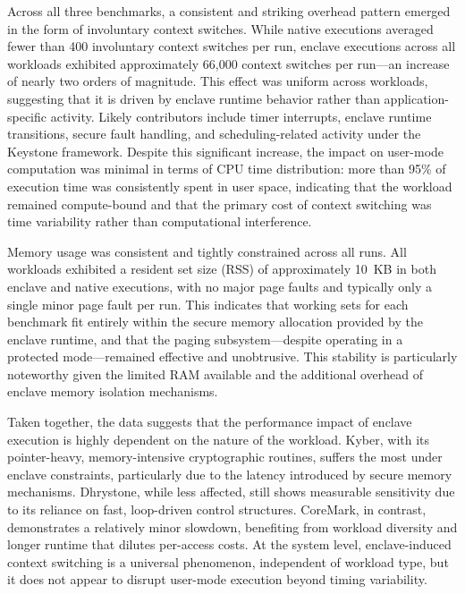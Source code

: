 Across all three benchmarks, a consistent and striking overhead pattern emerged in the form of involuntary context switches. While native executions averaged fewer than 400 involuntary context switches per run, enclave executions across all workloads exhibited approximately 66,000 context switches per run—an increase of nearly two orders of magnitude. This effect was uniform across workloads, suggesting that it is driven by enclave runtime behavior rather than application-specific activity. Likely contributors include timer interrupts, enclave runtime transitions, secure fault handling, and scheduling-related activity under the Keystone framework. Despite this significant increase, the impact on user-mode computation was minimal in terms of CPU time distribution: more than 95\% of execution time was consistently spent in user space, indicating that the workload remained compute-bound and that the primary cost of context switching was time variability rather than computational interference.

Memory usage was consistent and tightly constrained across all runs. All workloads exhibited a resident set size (RSS) of approximately 10~KB in both enclave and native executions, with no major page faults and typically only a single minor page fault per run. This indicates that working sets for each benchmark fit entirely within the secure memory allocation provided by the enclave runtime, and that the paging subsystem—despite operating in a protected mode—remained effective and unobtrusive. This stability is particularly noteworthy given the limited RAM available and the additional overhead of enclave memory isolation mechanisms.

Taken together, the data suggests that the performance impact of enclave execution is highly dependent on the nature of the workload. Kyber, with its pointer-heavy, memory-intensive cryptographic routines, suffers the most under enclave constraints, particularly due to the latency introduced by secure memory mechanisms. Dhrystone, while less affected, still shows measurable sensitivity due to its reliance on fast, loop-driven control structures. CoreMark, in contrast, demonstrates a relatively minor slowdown, benefiting from workload diversity and longer runtime that dilutes per-access costs. At the system level, enclave-induced context switching is a universal phenomenon, independent of workload type, but it does not appear to disrupt user-mode execution beyond timing variability.

